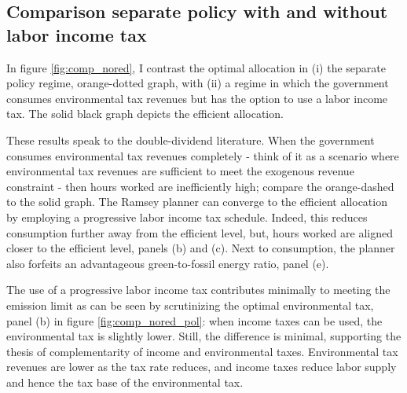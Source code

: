 \subsection{Comparison separate policy with and without labor income tax}\label{app:comp_separate}


In figure \ref{fig:comp_nored}, I contrast the optimal allocation in (i) the separate policy regime, orange-dotted graph, with (ii) a regime in which the government consumes environmental tax revenues but has the option to use a labor income tax. The solid black graph depicts the efficient allocation. 

These results speak to the double-dividend literature. When the government consumes environmental tax revenues completely - think of it as a scenario where environmental tax revenues are sufficient to meet the exogenous revenue constraint - then hours worked are inefficiently high; compare the orange-dashed to  the solid graph. The Ramsey planner can converge to the efficient allocation by employing a progressive labor income tax schedule. Indeed, this reduces consumption further away from the efficient level, but, hours worked are aligned closer to the efficient level, panels (b) and (c). Next to consumption, the planner also forfeits an advantageous green-to-fossil energy ratio, panel (e). 

The use of a progressive labor income tax contributes minimally to meeting the emission limit as can be seen by scrutinizing the optimal environmental tax, panel (b) in figure \ref{fig:comp_nored_pol}: when income taxes can be used, the environmental tax is slightly lower. Still, the difference is minimal, supporting the thesis of complementarity of income and environmental taxes. 
Environmental tax revenues are lower as the tax rate reduces, and income taxes reduce labor supply and hence the tax base of the environmental tax. 

